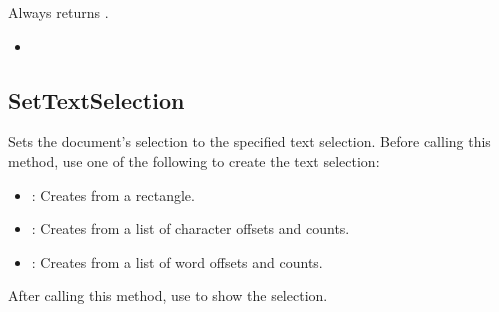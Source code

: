 \documentclass[letterpaper,12pt,english,openany,oneside]{sphinxmanual}
\begin{document}

Always returns .

\label{\detokenize{IAC_API_OLE_Objects:related-methods-44}}
\begin{itemize}
\item {} 
 

\end{itemize}




\subsection{SetTextSelection}
\label{\detokenize{IAC_API_OLE_Objects:settextselection}}
Sets the document’s selection to the specified text selection. Before calling this method, use one of the following to create the text selection:
\begin{itemize}
\item {} 
  : Creates from a rectangle.

\item {} 
  : Creates from a list of character offsets and counts.

\item {} 
  : Creates from a list of word offsets and counts.

\end{itemize}

After calling this method, use   to show the selection.


\begin{sphinxVerbatim}[commandchars=\\\{\}]
  
\end{sphinxVerbatim}
\label{\detokenize{IAC_API_OLE_Objects:parameters-30}}
\end{document}
